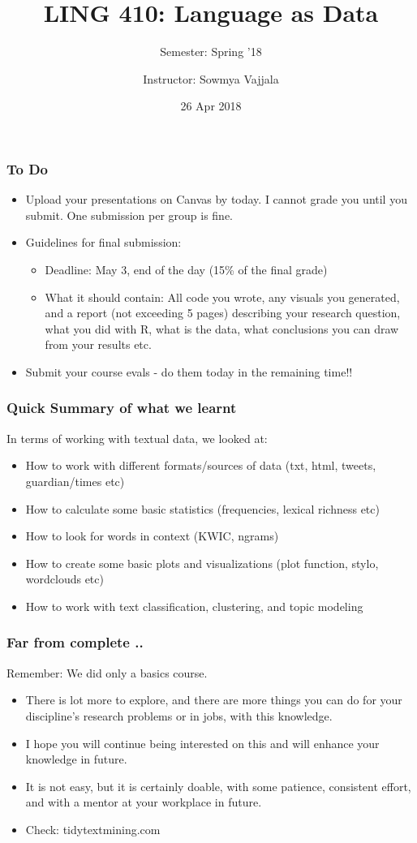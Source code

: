 \documentclass{beamer}
\author[Sowmya Vajjala]{Instructor: Sowmya Vajjala}
\title[LING 410]{LING 410: Language as Data}
\subtitle{Semester: Spring '18}
\date{26 Apr 2018}
\institute{Iowa State University, USA}
\begin{document}
\begin{frame}\titlepage
\end{frame}

\begin{frame}
\frametitle{To Do}
\begin{itemize}
\item Upload your presentations on Canvas by today. I cannot grade you until you submit. One submission per group is fine. 
\item Guidelines for final submission:
\begin{itemize}
\item Deadline: May 3, end of the day (15\% of the final grade)
\item What it should contain: All code you wrote, any visuals you generated, and a report (not exceeding 5 pages) describing your research question, what you did with R, what is the data, what conclusions you can draw from your results etc.
\end{itemize}
\item Submit your course evals - do them today in the remaining time!!
\end{itemize}
\end{frame}

\begin{frame}
\frametitle{Quick Summary of what we learnt}
In terms of working with textual data, we looked at:
\begin{itemize}
\item How to work with different formats/sources of data (txt, html, tweets, guardian/times etc)
\item How to calculate some basic statistics (frequencies, lexical richness etc)
\item How to look for words in context (KWIC, ngrams)
\item How to create some basic plots and visualizations (plot function, stylo, wordclouds etc)
\item How to work with text classification, clustering, and topic modeling
\end{itemize}
\end{frame}

\begin{frame}
\frametitle{Far from complete ..}
Remember: We did only a basics course.
\begin{itemize}
\item There is lot more to explore, and there are more things you can do for your discipline's research problems or in jobs, with this knowledge.
\item I hope you will continue being interested on this and will enhance your knowledge in future.
\item It is not easy, but it is certainly doable, with some patience, consistent effort, and with a mentor at your workplace in future.
\item Check: tidytextmining.com 
\end{itemize}
\end{frame}
\end{document}
